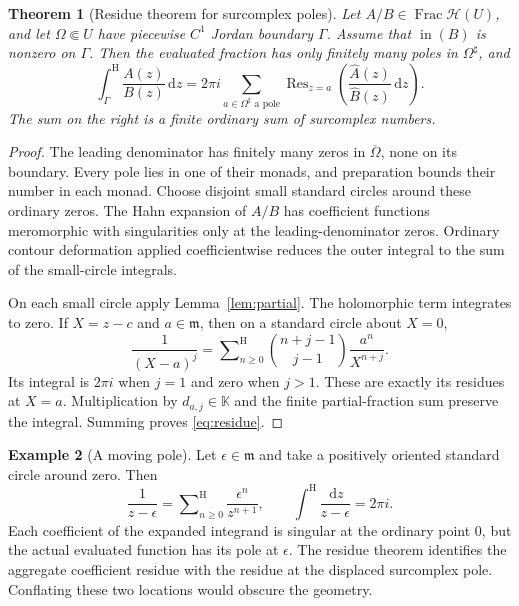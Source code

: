 \documentclass[11pt,oneside]{article}
\newtheorem{theorem}{Theorem}[section]
\theoremstyle{definition}\newtheorem{definition}[theorem]{Definition}
\newtheorem{example}[theorem]{Example}
\newcommand{\K}{\mathbb K}
\newcommand{\HH}{\mathcal H}
\newcommand{\mm}{\mathfrak m}
\newcommand{\Res}{\operatorname{Res}}
\newcommand{\dd}{\,\mathrm d}
\newcommand{\Hsum}{\mathop{\sum}\nolimits^{\mathrm H}}
\newcommand{\htop}{\mathrm H}
\newcommand{\lead}{\operatorname{in}}
\begin{document}
\begin{theorem}[Residue theorem for surcomplex poles]\label{thm:residuetheorem}
Let $A/B\in\operatorname{Frac}\HH(U)$, and let $\Omega\Subset U$ have piecewise $C^1$ Jordan boundary $\Gamma$. Assume that $\lead(B)$ is nonzero on $\Gamma$. Then the evaluated fraction has only finitely many poles in $\Omega^\sharp$, and
\begin{equation}\label{eq:residue}
 \int_\Gamma^{\htop}\frac{A(z)}{B(z)}\dd z
 =2\pi i\sum_{a\in\Omega^\sharp\text{ a pole}}
       \Res_{z=a}\left(\frac{\widehat A(z)}{\widehat B(z)}\dd z\right).
\end{equation}
The sum on the right is a finite ordinary sum of surcomplex numbers.
\end{theorem}
\begin{proof}
The leading denominator has finitely many zeros in $\overline\Omega$, none on its boundary. Every pole lies in one of their monads, and preparation bounds their number in each monad. Choose disjoint small standard circles around these ordinary zeros. The Hahn expansion of $A/B$ has coefficient functions meromorphic with singularities only at the leading-denominator zeros. Ordinary contour deformation applied coefficientwise reduces the outer integral to the sum of the small-circle integrals.

On each small circle apply Lemma~\ref{lem:partial}. The holomorphic term integrates to zero. If $X=z-c$ and $a\in\mm$, then on a standard circle about $X=0$,
\[
 \frac1{(X-a)^j}
 =\Hsum_{n\geq0}\binom{n+j-1}{j-1}\frac{a^n}{X^{n+j}}.
\]
Its integral is $2\pi i$ when $j=1$ and zero when $j>1$. These are exactly its residues at $X=a$. Multiplication by $d_{a,j}\in\K$ and the finite partial-fraction sum preserve the integral. Summing proves \eqref{eq:residue}.
\end{proof}

\begin{example}[A moving pole]
Let $\epsilon\in\mm$ and take a positively oriented standard circle around zero. Then
\[
 \frac1{z-\epsilon}=\Hsum_{n\geq0}\frac{\epsilon^n}{z^{n+1}},
 \qquad
 \int^{\htop}\frac{\dd z}{z-\epsilon}=2\pi i.
\]
Each coefficient of the expanded integrand is singular at the ordinary point $0$, but the actual evaluated function has its pole at $\epsilon$. The residue theorem identifies the aggregate coefficient residue with the residue at the displaced surcomplex pole. Conflating these two locations would obscure the geometry.
\end{example}
\end{document}
